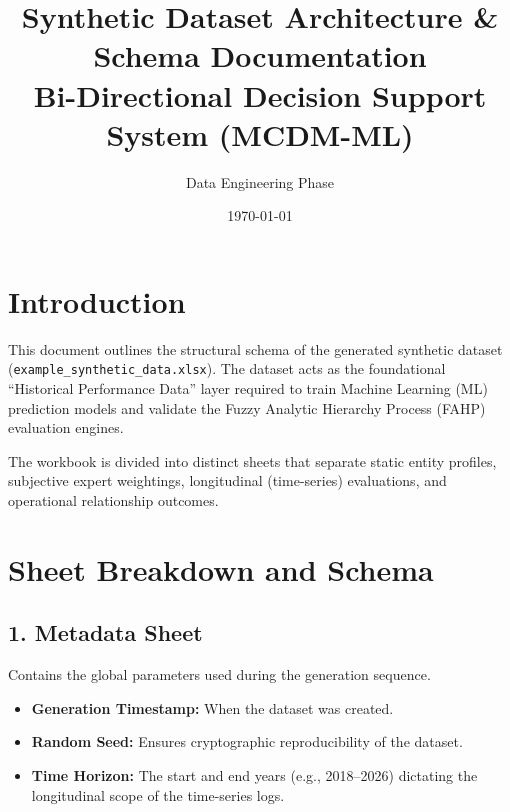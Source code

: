 \documentclass[11pt]{article}
\title{\textbf{Synthetic Dataset Architecture \& Schema Documentation}\\
\large Bi-Directional Decision Support System (MCDM-ML)}
\author{Data Engineering Phase}
\date{\today}
\begin{document}
\maketitle

\section{Introduction}
This document outlines the structural schema of the generated synthetic dataset (\texttt{example\_synthetic\_data.xlsx}). The dataset acts as the foundational ``Historical Performance Data'' layer required to train Machine Learning (ML) prediction models and validate the Fuzzy Analytic Hierarchy Process (FAHP) evaluation engines. 

The workbook is divided into distinct sheets that separate static entity profiles, subjective expert weightings, longitudinal (time-series) evaluations, and operational relationship outcomes.

\section{Sheet Breakdown and Schema}

\subsection{1. Metadata Sheet}
Contains the global parameters used during the generation sequence.
\begin{itemize}
    \item \textbf{Generation Timestamp:} When the dataset was created.
    \item \textbf{Random Seed:} Ensures cryptographic reproducibility of the dataset.
    \item \textbf{Time Horizon:} The start and end years (e.g., 2018--2026) dictating the longitudinal scope of the time-series logs.
\end{itemize}
\end{document}
